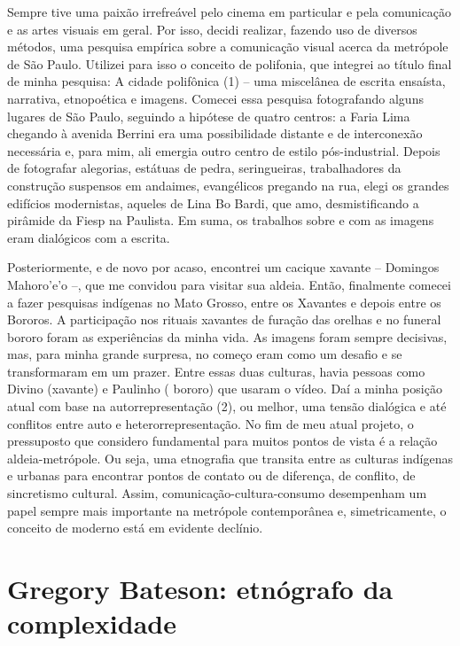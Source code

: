 \documentclass[a4paper, 12pt]{article} %
\begin{document}
Sempre tive uma paixão irrefreável pelo cinema em particular e pela comunicação e as artes visuais em geral. Por isso, decidi realizar, fazendo uso de diversos métodos, uma pesquisa empírica sobre a comunicação visual acerca da metrópole de São Paulo. Utilizei para isso o conceito de polifonia, que integrei ao título final de minha pesquisa: A cidade polifônica (1) – uma miscelânea de escrita ensaísta, narrativa, etnopoética e imagens. Comecei essa pesquisa fotografando alguns lugares de São Paulo, seguindo a hipótese de quatro centros: a Faria Lima chegando à avenida Berrini era uma possibilidade distante e de interconexão necessária e, para mim, ali emergia outro centro de estilo pós-industrial. Depois de fotografar alegorias, estátuas de pedra, seringueiras, trabalhadores da construção suspensos em andaimes, evangélicos pregando na rua, elegi os grandes edifícios modernistas, aqueles de Lina Bo Bardi, que amo, desmistificando a pirâmide da Fiesp na Paulista. Em suma, os trabalhos sobre e com as imagens eram dialógicos com a escrita. 

Posteriormente, e de novo por acaso, encontrei um cacique xavante – Domingos Mahoro’e’o –, que me convidou para visitar sua aldeia. Então, finalmente comecei a fazer pesquisas indígenas no Mato Grosso, entre os Xavantes e depois entre os Bororos. A participação nos rituais xavantes de furação das orelhas e no funeral bororo foram as experiências da minha vida. As imagens foram sempre decisivas, mas, para minha grande surpresa, no começo eram como um desafio e se transformaram em um prazer. Entre essas duas culturas, havia pessoas como Divino (xavante) e Paulinho ( bororo) que usaram o vídeo. Daí a minha posição atual com base na autorrepresentação (2), ou melhor, uma tensão dialógica e até conflitos entre auto e heterorrepresentação. No fim de meu atual projeto, o pressuposto que considero fundamental para muitos pontos de vista é a relação aldeia-metrópole. Ou seja, uma etnografia que transita entre as culturas indígenas e urbanas para encontrar pontos de contato ou de diferença, de conflito, de sincretismo cultural. Assim, comunicação-cultura-consumo desempenham um papel sempre mais importante na metrópole contemporânea e, simetricamente, o conceito de moderno está em evidente declínio.



\section*{Gregory Bateson: etnógrafo da complexidade}\label{sec:bat}
\end{document}
